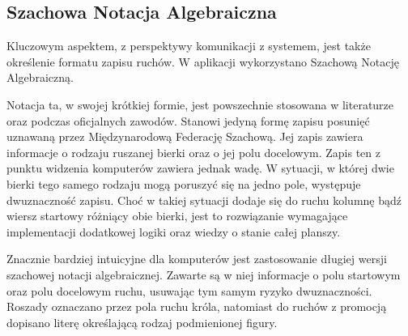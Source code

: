 \subsection{Szachowa Notacja Algebraiczna}
\label{subsec:notacja-algebraiczna}

Kluczowym aspektem, z perspektywy komunikacji z systemem, jest także określenie formatu zapisu ruchów.
W aplikacji wykorzystano Szachową Notację Algebraiczną.

Notacja ta, w swojej krótkiej formie, jest powszechnie stosowana w literaturze oraz podczas oficjalnych zawodów.
Stanowi jedyną formę zapisu posunięć uznawaną przez Międzynarodową Federację Szachową.
Jej zapis zawiera informacje o rodzaju ruszanej bierki oraz o jej polu docelowym.
Zapis ten z punktu widzenia komputerów zawiera jednak wadę.
W sytuacji, w której dwie bierki tego samego rodzaju mogą poruszyć się na jedno pole, występuje dwuznaczność zapisu.
Choć w takiej sytuacji dodaje się do ruchu kolumnę bądź wiersz startowy różniący obie bierki, jest to rozwiązanie wymagające implementacji dodatkowej logiki oraz wiedzy o stanie całej planszy.

Znacznie bardziej intuicyjne dla komputerów jest zastosowanie długiej wersji szachowej notacji algebraicznej.
Zawarte są w niej informacje o polu startowym oraz polu docelowym ruchu, usuwając tym samym ryzyko dwuznaczności.
Roszady oznaczano przez pola ruchu króla, natomiast do ruchów z promocją dopisano literę określającą rodzaj podmienionej figury.

